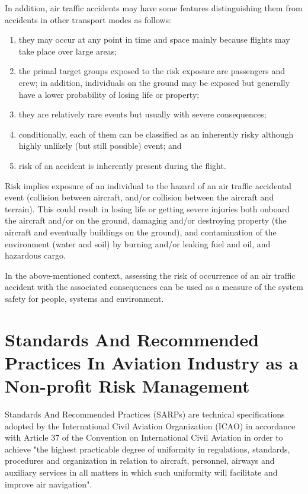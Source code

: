 \documentclass[a4paper, 10pt]{article}
\begin{document}
In addition, air traffic accidents may have some features
distinguishing them from accidents in other transport modes as
follows: 
\begin{enumerate}
		\item they may occur at any point in time and space
mainly because flights may take place over large areas; 
		\item the
primal target groups exposed to the risk exposure are
passengers and crew; in addition, individuals on the ground
may be exposed but generally have a lower probability of
losing life or property; 
		\item they are relatively rare events but
usually with severe consequences; 
		\item conditionally, each of
them can be classified as an inherently risky although highly
unlikely (but still possible) event; and 
		\item risk of an accident is inherently present during the flight.
\end{enumerate}
\par

Risk implies exposure of an individual to the hazard of an
air traffic accidental event (collision between aircraft, and/or
collision between the aircraft and terrain). This could result in
losing life or getting severe injuries both onboard the aircraft
and/or on the ground, damaging and/or destroying property (the
aircraft and eventually buildings on the ground), and
contamination of the environment (water and soil) by burning
and/or leaking fuel and oil, and hazardous cargo.\par

In the above-mentioned context, assessing the risk of
occurrence of an air traffic accident with the associated
consequences can be used as a measure of the system safety for
people, systems and environment.\par

\section{Standards And Recommended Practices In Aviation Industry as a Non-profit Risk Management}
Standards And Recommended Practices (SARPs) are technical specifications adopted by the International Civil Aviation Organization (ICAO) in accordance with Article 37 of the Convention on International Civil Aviation in order to achieve "the highest practicable degree of uniformity in regulations, standards, procedures and organization in relation to aircraft, personnel, airways and auxiliary services in all matters in which such uniformity will facilitate and improve air navigation".\par
\end{document}

